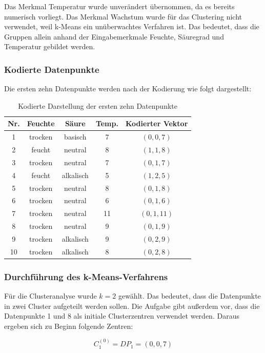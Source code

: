 \documentclass[12pt,a4paper]{article}
\begin{document}
Das Merkmal Temperatur wurde unverändert übernommen, da es bereits numerisch vorliegt. Das Merkmal Wachstum wurde für das Clustering nicht verwendet, weil k-Means ein unüberwachtes Verfahren ist. Das bedeutet, dass die Gruppen allein anhand der Eingabemerkmale Feuchte, Säuregrad und Temperatur gebildet werden.

\subsubsection{Kodierte Datenpunkte}

Die ersten zehn Datenpunkte werden nach der Kodierung wie folgt dargestellt:

\begin{table}[h]
\centering
\begin{tabular}{c|c|c|c|c}
\hline
Nr. & Feuchte & Säure & Temp. & Kodierter Vektor \\
\hline
1 & trocken & basisch & 7 & $(0,0,7)$ \\
2 & feucht & neutral & 8 & $(1,1,8)$ \\
3 & trocken & neutral & 7 & $(0,1,7)$ \\
4 & feucht & alkalisch & 5 & $(1,2,5)$ \\
5 & trocken & neutral & 8 & $(0,1,8)$ \\
6 & trocken & neutral & 6 & $(0,1,6)$ \\
7 & trocken & neutral & 11 & $(0,1,11)$ \\
8 & trocken & neutral & 9 & $(0,1,9)$ \\
9 & trocken & alkalisch & 9 & $(0,2,9)$ \\
10 & trocken & alkalisch & 8 & $(0,2,8)$ \\
\hline
\end{tabular}
\caption{Kodierte Darstellung der ersten zehn Datenpunkte}
\end{table}

\subsubsection{Durchführung des k-Means-Verfahrens}

Für die Clusteranalyse wurde $k=2$ gewählt. Das bedeutet, dass die Datenpunkte in zwei Cluster aufgeteilt werden sollen. Die Aufgabe gibt außerdem vor, dass die Datenpunkte 1 und 8 als initiale Clusterzentren verwendet werden. Daraus ergeben sich zu Beginn folgende Zentren:

\[
C_1^{(0)} = DP_1 = (0,0,7)
\]
\end{document}
